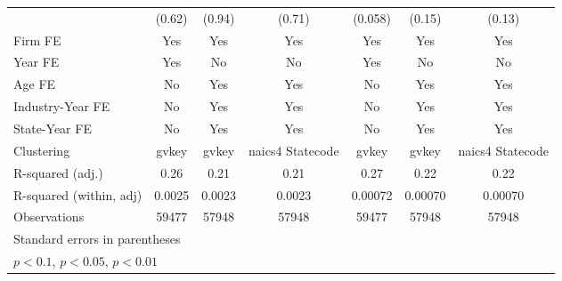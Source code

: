 {\begin{tabular}{l*{6}{c}}
                    &      (0.62)         &      (0.94)         &      (0.71)         &     (0.058)         &      (0.15)         &      (0.13)         \\
\addlinespace
Firm FE             &         Yes         &         Yes         &         Yes         &         Yes         &         Yes         &         Yes         \\
\addlinespace
Year FE             &         Yes         &          No         &          No         &         Yes         &          No         &          No         \\
\addlinespace
Age FE              &          No         &         Yes         &         Yes         &          No         &         Yes         &         Yes         \\
\addlinespace
Industry-Year FE    &          No         &         Yes         &         Yes         &          No         &         Yes         &         Yes         \\
\addlinespace
State-Year FE       &          No         &         Yes         &         Yes         &          No         &         Yes         &         Yes         \\
\midrule
Clustering          &       gvkey         &       gvkey         &naics4 Statecode         &       gvkey         &       gvkey         &naics4 Statecode         \\
R-squared (adj.)    &        0.26         &        0.21         &        0.21         &        0.27         &        0.22         &        0.22         \\
R-squared (within, adj)&      0.0025         &      0.0023         &      0.0023         &     0.00072         &     0.00070         &     0.00070         \\
Observations        &       59477         &       57948         &       57948         &       59477         &       57948         &       57948         \\
\bottomrule
\multicolumn{7}{l}{\footnotesize Standard errors in parentheses}\\
\multicolumn{7}{l}{\footnotesize \sym{*} \(p<0.1\), \sym{**} \(p<0.05\), \sym{***} \(p<0.01\)}\\
\end{tabular}
}

